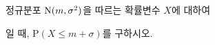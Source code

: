 정규분포 $\mathrm{N}(m{,}\mkern3mu\mathopen{}\sigma^2)$을 따르는 확률변수 $X$에 대하여\par\smallskip{}\par\smallskip\noindent 일 때, $\mathrm{P}(X\le m+\sigma)$를 구하시오.
